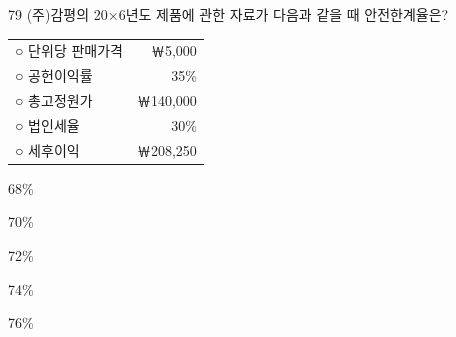 \begin{question}{79}
(주)감평의 20×6년도 제품에 관한 자료가 다음과 같을 때 안전한계율은?
\begin{framedtext}
\begin{tabularx}{\linewidth}{@{}Xr@{}}
○ 단위당 판매가격 & ￦5,000 \\
○ 공헌이익률 & 35\% \\
○ 총고정원가 & ￦140,000 \\
○ 법인세율 & 30\% \\
○ 세후이익 & ￦208,250 \\
\end{tabularx}
\end{framedtext}
\begin{choices}
  \item 68\%
  \item 70\%
  \item 72\%
  \item 74\%
  \item 76\%
\end{choices}
\end{question}
